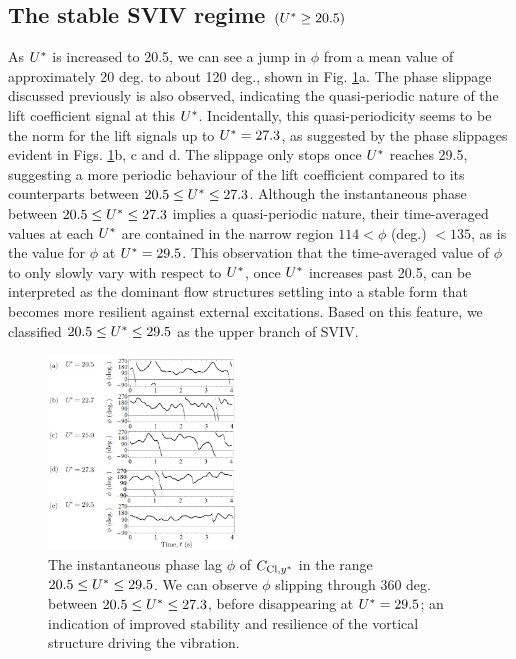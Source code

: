 \documentclass[a4paper,fleqn]{cas-sc}
\begin{document}
\subsection{The stable SVIV regime $\left ( U^{*} \geq 20.5 \right )$} \label{ssec:svivRegime}
As $U^{*}$ is increased to 20.5, we can see a jump in $\phi$ from a mean value of approximately 20 deg. to about 120 deg., shown in Fig. \ref{fig:phaseAngle}a. The phase slippage discussed previously is also observed, indicating the quasi-periodic nature of the lift coefficient signal at this $U^{*}$. Incidentally, this quasi-periodicity seems to be the norm for the lift signals up to $U^{*} = 27.3$, as suggested by the phase slippages evident in Figs. \ref{fig:phaseAngle}b, c and d. The slippage only stops once $U^{*}$ reaches 29.5, suggesting a more periodic behaviour of the lift coefficient compared to its counterparts between $20.5 \leq U^{*} \leq 27.3$. Although the instantaneous phase between $20.5 \leq U^{*} \leq 27.3$ implies a quasi-periodic nature, their time-averaged values at each $U^{*}$ are contained in the narrow region $114 < \phi$ (deg.) $< 135$, as is the value for $\phi$ at $U^{*} = 29.5$. This observation that the time-averaged value of $\phi$ to only slowly vary with respect to $U^{*}$, once $U^{*}$ increases past 20.5, can be interpreted as the dominant flow structures settling into a stable form that becomes more resilient against external excitations. Based on this feature, we classified $20.5 \leq U^{*} \leq 29.5$ as the upper branch of SVIV.

\begin{figure}
  \centering
  \includegraphics[width=0.45\textwidth]{figs/figure18}
  \caption{The instantaneous phase lag $\phi$ of $C_{\text{Cl},y^{*}}$ in the range $20.5 \leq U^{*} \leq 29.5$. We can observe $\phi$ slipping through 360 deg. between $20.5 \leq U^{*} \leq 27.3$, before disappearing at $U^{*} = 29.5$; an indication of improved stability and resilience of the vortical structure driving the vibration.}
  \label{fig:phaseAngle}
\end{figure}
\end{document}

